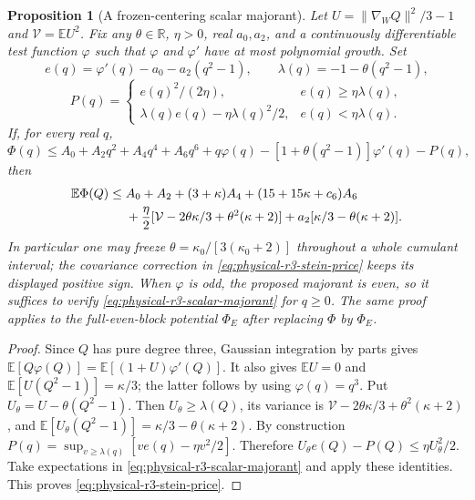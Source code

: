 \documentclass[11pt]{article}
\newtheorem{proposition}[theorem]{Proposition}
\begin{document}
\begin{proposition}[A frozen-centering scalar majorant]
\label{prop:physical-r3-stein-majorant}
Let $U=\|\nabla_WQ\|^2/3-1$ and $\mathcal V=\mathbb EU^2$.
Fix any $\theta\in\mathbb R$, $\eta>0$, real $a_0,a_2$, and a
continuously differentiable test function $\varphi$ such that
$\varphi$ and $\varphi'$ have at most polynomial growth.
Set
\[
 e(q)=\varphi'(q)-a_0-a_2(q^2-1),\qquad
 \lambda(q)=-1-\theta(q^2-1),
\]
\[
 P(q)=\begin{cases}
 e(q)^2/(2\eta),&e(q)\geq\eta\lambda(q),\\
 \lambda(q)e(q)-\eta\lambda(q)^2/2,&e(q)<\eta\lambda(q).
 \end{cases}
\]
If, for every real $q$,
\begin{equation}\label{eq:physical-r3-scalar-majorant}
 \Phi(q)\leq A_0+A_2q^2+A_4q^4+A_6q^6+
 q\varphi(q)-[1+\theta(q^2-1)]\varphi'(q)-P(q),
\end{equation}
then
\begin{align}\label{eq:physical-r3-stein-price}
 \mathbb E\Phi(Q)\leq{}&A_0+A_2+(3+\kappa)A_4
 +(15+15\kappa+c_6)A_6\notag\\
 &+\frac\eta2[\mathcal V-2\theta\kappa/3+\theta^2(\kappa+2)]
 +a_2[\kappa/3-\theta(\kappa+2)].
\end{align}
In particular one may freeze $\theta=\kappa_0/[3(\kappa_0+2)]$
throughout a whole cumulant interval; the covariance correction in
\eqref{eq:physical-r3-stein-price} keeps its displayed positive sign.
When $\varphi$ is odd, the proposed majorant is even, so it suffices
to verify \eqref{eq:physical-r3-scalar-majorant} for $q\geq0$. The same
proof applies to the full-even-block potential $\Phi_E$ after replacing
$\Phi$ by $\Phi_E$.
\end{proposition}
\begin{proof}
Since $Q$ has pure degree three, Gaussian integration by parts gives
$\mathbb E[Q\varphi(Q)]=\mathbb E[(1+U)\varphi'(Q)]$.
It also gives $\mathbb EU=0$ and
$\mathbb E[U(Q^2-1)]=\kappa/3$; the latter follows by using
$\varphi(q)=q^3$.  Put $U_\theta=U-\theta(Q^2-1)$.
Then $U_\theta\geq\lambda(Q)$, its variance is
$\mathcal V-2\theta\kappa/3+\theta^2(\kappa+2)$, and
$\mathbb E[U_\theta(Q^2-1)]=\kappa/3-\theta(\kappa+2)$.
By construction $P(q)=\sup_{v\geq\lambda(q)}[ve(q)-\eta v^2/2]$.
Therefore $U_\theta e(Q)-P(Q)\leq\eta U_\theta^2/2$.
Take expectations in \eqref{eq:physical-r3-scalar-majorant} and apply
these identities.  This proves \eqref{eq:physical-r3-stein-price}.
\end{proof}
\end{document}

